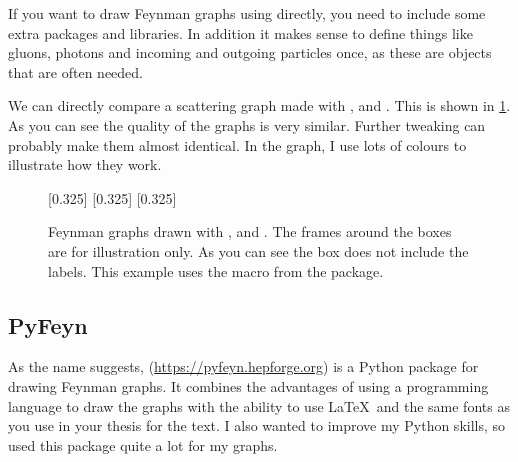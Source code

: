 If you want to draw Feynman graphs using \TikZ directly,
you need to include some extra \TikZ packages and libraries.
In addition it makes sense to
define things like gluons, photons and incoming and outgoing particles
once, as these are objects that are often needed.

We can directly compare a scattering graph made with
, \Package{\TikZ} and .
This is shown in \cref{fig:feyn:cf}.
As you can see the quality of the graphs is very similar.
Further tweaking can probably make them almost identical.
In the  graph, I use lots of colours to illustrate how they work.

\begin{figure}[htbp]
\begin{tcblisting}{}
\centering
{}
  [0.325\textwidth]{
}
\subcaptionbox{\TikZ\label{fig:feyn:tikz}}
  [0.325\textwidth]{\fbox{%
    
  }
}
  [0.325\textwidth]{
}
\caption{Feynman graphs drawn with , \Package{\TikZ} and .
  The frames around the boxes are for illustration only.
  As you can see the  box does not include the labels.
  This example uses the  macro from the  package.}%
\label{fig:feyn:cf}
\end{tcblisting}
\end{figure}


\subsection{PyFeyn}%
\label{sec:fig:pyfeyn}

As the name suggests,  (\url{https://pyfeyn.hepforge.org})
is a Python package for drawing Feynman graphs.
It combines the advantages of using a programming language to draw the graphs
with the ability to use \LaTeX\ and the same fonts as you use in your thesis for the text.
I also wanted to improve my Python skills, so used this package quite a lot for my graphs.

